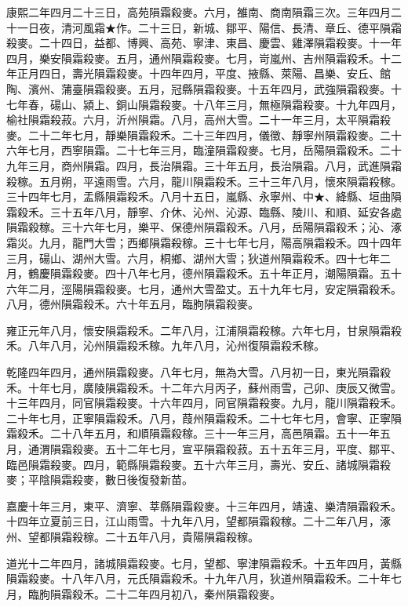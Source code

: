 \begin{pinyinscope}
康熙二年四月二十三日，高苑隕霜殺麥。六月，雒南、商南隕霜三次。三年四月二十一日夜，清河風霜★作。二十三日，新城、鄒平、陽信、長清、章丘、德平隕霜殺麥。二十四日，益都、博興、高苑、寧津、東昌、慶雲、雞澤隕霜殺麥。十一年四月，樂安隕霜殺麥。五月，通州隕霜殺麥。七月，岢嵐州、吉州隕霜殺禾。十二年正月四日，壽光隕霜殺麥。十四年四月，平度、掖縣、萊陽、昌樂、安丘、館陶、濱州、蒲臺隕霜殺麥。五月，冠縣隕霜殺麥。十五年四月，武強隕霜殺麥。十七年春，碭山、潁上、銅山隕霜殺麥。十八年三月，無極隕霜殺麥。十九年四月，榆社隕霜殺菽。六月，沂州隕霜。八月，高州大雪。二十一年三月，太平隕霜殺麥。二十二年七月，靜樂隕霜殺禾。二十三年四月，儀徵、靜寧州隕霜殺麥。二十六年七月，西寧隕霜。二十七年三月，臨潼隕霜殺麥。七月，岳陽隕霜殺禾。二十九年三月，商州隕霜。四月，長治隕霜。三十年五月，長治隕霜。八月，武進隕霜殺稼。五月朔，平遠雨雪。六月，龍川隕霜殺禾。三十三年八月，懷來隕霜殺稼。三十四年七月，盂縣隕霜殺禾。八月十五日，嵐縣、永寧州、中★、絳縣、垣曲隕霜殺禾。三十五年八月，靜寧、介休、沁州、沁源、臨縣、陵川、和順、延安各處隕霜殺稼。三十六年七月，樂平、保德州隕霜殺禾。八月，岳陽隕霜殺禾；沁、涿霜災。九月，龍門大雪；西鄉隕霜殺稼。三十七年七月，陽高隕霜殺禾。四十四年三月，碭山、湖州大雪。六月，桐鄉、湖州大雪；狄道州隕霜殺禾。四十七年二月，鶴慶隕霜殺麥。四十八年七月，德州隕霜殺禾。五十年正月，潮陽隕霜。五十六年二月，涇陽隕霜殺麥。七月，通州大雪盈丈。五十九年七月，安定隕霜殺禾。八月，德州隕霜殺禾。六十年五月，臨朐隕霜殺麥。

雍正元年八月，懷安隕霜殺禾。二年八月，江浦隕霜殺稼。六年七月，甘泉隕霜殺禾。八年八月，沁州隕霜殺禾稼。九年八月，沁州復隕霜殺禾稼。

乾隆四年四月，通州隕霜殺麥。八年七月，無為大雪。八月初一日，東光隕霜殺禾。十年七月，廣陵隕霜殺禾。十二年六月丙子，蘇州雨雪，己卯、庚辰又微雪。十三年四月，同官隕霜殺麥。十六年四月，同官隕霜殺麥。九月，龍川隕霜殺禾。二十年七月，正寧隕霜殺禾。八月，葭州隕霜殺禾。二十七年七月，會寧、正寧隕霜殺禾。二十八年五月，和順隕霜殺稼。三十一年三月，高邑隕霜。五十一年五月，通渭隕霜殺麥。五十二年七月，宣平隕霜殺菽。五十五年三月，平度、鄒平、臨邑隕霜殺麥。四月，範縣隕霜殺麥。五十六年三月，壽光、安丘、諸城隕霜殺麥；平陰隕霜殺麥，數日後復發新苗。

嘉慶十年三月，東平、濟寧、莘縣隕霜殺麥。十三年四月，靖遠、樂清隕霜殺禾。十四年立夏前三日，江山雨雪。十九年八月，望都隕霜殺稼。二十二年八月，涿州、望都隕霜殺稼。二十五年八月，貴陽隕霜殺稼。

道光十二年四月，諸城隕霜殺麥。七月，望都、寧津隕霜殺禾。十五年四月，黃縣隕霜殺麥。十八年八月，元氏隕霜殺禾。十九年八月，狄道州隕霜殺禾。二十年七月，臨朐隕霜殺禾。二十二年四月初八，秦州隕霜殺麥。


\end{pinyinscope}

